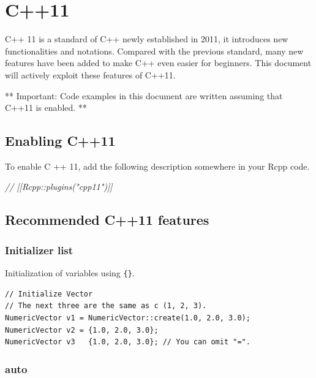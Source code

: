 \documentclass[]{book}
\newenvironment{Shaded}{\begin{snugshade}}{\end{snugshade}}
\newcommand{\CommentTok}[1]{\textcolor[rgb]{0.56,0.35,0.01}{\textit{#1}}}
\begin{document}
\hypertarget{c11}{%
\chapter{C++11}\label{c11}}

C++ 11 is a standard of C++ newly established in 2011, it introduces new functionalities and notations. Compared with the previous standard, many new features have been added to make C++ even easier for beginners. This document will actively exploit these features of C++11.

** Important: Code examples in this document are written assuming that C++11 is enabled. **

\hypertarget{enabling-c11}{%
\section{Enabling C++11}\label{enabling-c11}}

To enable C ++ 11, add the following description somewhere in your Rcpp code.

\begin{Shaded}
\begin{Highlighting}[]
\CommentTok{// [[Rcpp::plugins("cpp11")]]}
\end{Highlighting}
\end{Shaded}

\hypertarget{recommended-c11-features}{%
\section{Recommended C++11 features}\label{recommended-c11-features}}

\hypertarget{initializer-list}{%
\subsection{Initializer list}\label{initializer-list}}

Initialization of variables using \texttt{\{\}}.

\begin{verbatim}
// Initialize Vector
// The next three are the same as c (1, 2, 3).
NumericVector v1 = NumericVector::create(1.0, 2.0, 3.0);
NumericVector v2 = {1.0, 2.0, 3.0};
NumericVector v3   {1.0, 2.0, 3.0}; // You can omit "=".
\end{verbatim}

\hypertarget{auto}{%
\subsection{auto}\label{auto}}
\end{document}
